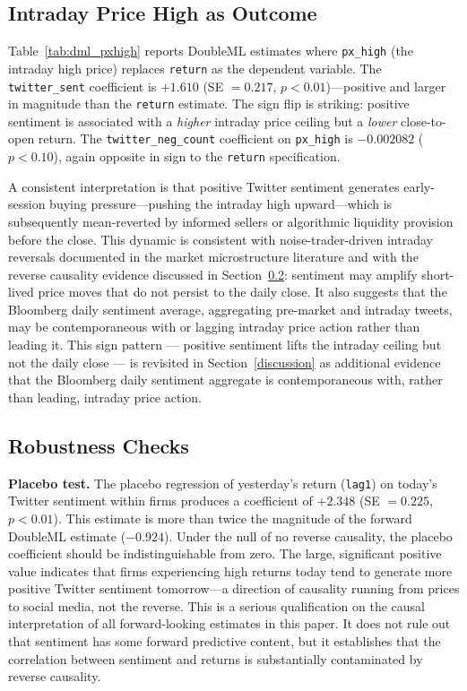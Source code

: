 \subsection{Intraday Price High as
Outcome}\label{intraday-price-high-as-outcome}

Table~\ref{tab:dml_pxhigh} reports
DoubleML estimates where \texttt{px\_high} (the intraday high price)
replaces \texttt{return} as the dependent variable. The
\texttt{twitter\_sent} coefficient is \(+ 1.610\) (SE \(= 0.217\),
\(p < 0.01\))---positive and larger in magnitude than the
\texttt{return} estimate. The sign flip is striking: positive sentiment
is associated with a \emph{higher} intraday price ceiling but a
\emph{lower} close-to-open return. The \texttt{twitter\_neg\_count}
coefficient on \texttt{px\_high} is \(- 0.002082\) (\(p < 0.10\)), again
opposite in sign to the \texttt{return} specification.

A consistent interpretation is that positive Twitter sentiment generates
early-session buying pressure---pushing the intraday high upward---which
is subsequently mean-reverted by informed sellers or algorithmic
liquidity provision before the close. This dynamic is consistent with
noise-trader-driven intraday reversals documented in the market
microstructure literature and with the reverse causality evidence
discussed in Section~\ref{robustness-checks}:
sentiment may amplify short-lived price moves that do not persist to the
daily close. It also suggests that the Bloomberg daily sentiment
average, aggregating pre-market and intraday tweets, may be
contemporaneous with or lagging intraday price action rather than
leading it.
This sign pattern --- positive sentiment lifts the intraday ceiling but not the daily close --- is revisited in Section~\ref{discussion} as additional evidence that the Bloomberg daily sentiment aggregate is contemporaneous with, rather than leading, intraday price action.

\subsection{Robustness Checks}\label{robustness-checks}

\textbf{Placebo test.} The placebo regression of yesterday's return
(\texttt{lag1}) on today's Twitter sentiment within firms produces a
coefficient of \(+ 2.348\) (SE \(= 0.225\), \(p < 0.01\)). This estimate
is more than twice the magnitude of the forward DoubleML estimate
(\(- 0.924\)). Under the null of no reverse causality, the placebo
coefficient should be indistinguishable from zero. The large,
significant positive value indicates that firms experiencing high
returns today tend to generate more positive Twitter sentiment
tomorrow---a direction of causality running from prices to social media,
not the reverse. This is a serious qualification on the causal
interpretation of all forward-looking estimates in this paper. It does
not rule out that sentiment has some forward predictive content, but it
establishes that the correlation between sentiment and returns is
substantially contaminated by reverse causality.

